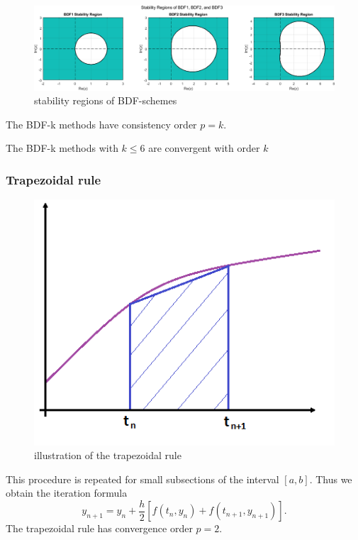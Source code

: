 	\begin{frame}
		\begin{figure}[H]
			\centering
			\includegraphics[width=0.8\linewidth]{../Tex/pictures/bdf_stability_regions.png}
			\caption{stability regions of BDF-schemes}
			\label{fig:screenshot020}
		\end{figure}
		\begin{theorem}%
			The BDF-k methods have consistency order $p=k$.
		\end{theorem}
%		
		\begin{corollary}
			The BDF-k methods with $k \leq 6$ are convergent with order $k$
		\end{corollary}
	\end{frame}
	
	\subsubsection{Trapezoidal rule}
	
	\begin{frame}
		\vfill
		\begin{figure}[H]
			\centering
			\includegraphics[width=0.3\linewidth]{../Tex/pictures/trapezoidal_rule.png}
			\caption{illustration of the trapezoidal rule}
			\label{fig:trapezoidal rule}
		\end{figure}
		This procedure is repeated for small subsections of the interval $[a,b]$. Thus we obtain the iteration formula
		\begin{displaymath}
			y_{n+1} = y_n +\frac{h}{2}[f(t_n,y_n) + f(t_{n+1}, y_{n+1})].
		\end{displaymath}
		The trapezoidal rule has convergence order $p=2$.
		\vfill
	\end{frame}
	
